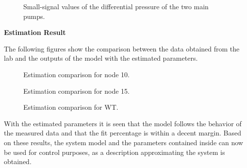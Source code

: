 \begin{figure}[H]
\centering
 
\caption{Small-signal values of the differential pressure of the two main pumps.}
\label{fig:est_deltap_data_final}
\end{figure}



\textbf{Estimation Result}
\label{estim_results}

The following figures show the comparison between the data obtained from the lab and the outputs of the model with the estimated parameters.  

\begin{figure}[H]
  \centering
    
    \caption{Estimation comparison for node 10.}
\end{figure}


\begin{figure}[H]
   \centering
    
    \caption{Estimation comparison for node 15.}
\end{figure}


\begin{figure}[H]
   \centering
    
    \caption{Estimation comparison for WT.}
\end{figure}


With the estimated parameters it is seen that the model follows the behavior of the measured data and that the fit percentage is within a decent margin. 
Based on these results, the system model and the parameters contained inside can now be used for control purposes, as a description approximating the 
system is obtained.   

